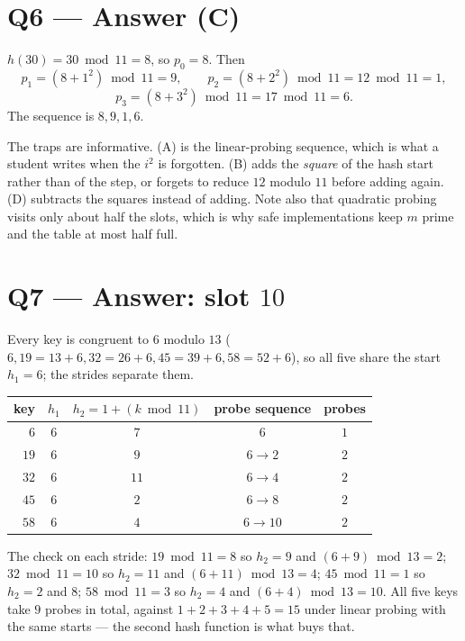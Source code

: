 \documentclass[11pt]{article}
\begin{document}
\section*{Q6 --- Answer (C)}

$h(30) = 30 \bmod 11 = 8$, so $p_0 = 8$. Then
\[
  p_1 = (8 + 1^2) \bmod 11 = 9,\qquad
  p_2 = (8 + 2^2) \bmod 11 = 12 \bmod 11 = 1,
\]
\[
  p_3 = (8 + 3^2) \bmod 11 = 17 \bmod 11 = 6 .
\]
The sequence is $8, 9, 1, 6$.

The traps are informative. (A) is the linear-probing sequence, which is what a student writes when the $i^2$ is forgotten. (B) adds the \emph{square} of the hash start rather than of the step, or forgets to reduce $12$ modulo $11$ before adding again. (D) subtracts the squares instead of adding. Note also that quadratic probing visits only about half the slots, which is why safe implementations keep $m$ prime and the table at most half full.

\section*{Q7 --- Answer: slot $10$}

Every key is congruent to $6$ modulo $13$ ($6, 19 = 13+6, 32 = 26+6, 45 = 39+6, 58 = 52+6$), so all five share the start $h_1 = 6$; the strides separate them.

\begin{center}
{\small
\begin{tabular}{rcccc}
  \toprule
  key & $h_1$ & $h_2 = 1 + (k \bmod 11)$ & probe sequence & probes \\
  \midrule
  $6$  & $6$ & $7$  & $6$ & $1$ \\
  $19$ & $6$ & $9$  & $6 \to 2$ & $2$ \\
  $32$ & $6$ & $11$ & $6 \to 4$ & $2$ \\
  $45$ & $6$ & $2$  & $6 \to 8$ & $2$ \\
  $58$ & $6$ & $4$  & $6 \to 10$ & $2$ \\
  \bottomrule
\end{tabular}}
\end{center}

The check on each stride: $19 \bmod 11 = 8$ so $h_2 = 9$ and $(6+9) \bmod 13 = 2$; $32 \bmod 11 = 10$ so $h_2 = 11$ and $(6+11) \bmod 13 = 4$; $45 \bmod 11 = 1$ so $h_2 = 2$ and $8$; $58 \bmod 11 = 3$ so $h_2 = 4$ and $(6+4) \bmod 13 = 10$. All five keys take $9$ probes in total, against $1+2+3+4+5 = 15$ under linear probing with the same starts --- the second hash function is what buys that.
\end{document}
